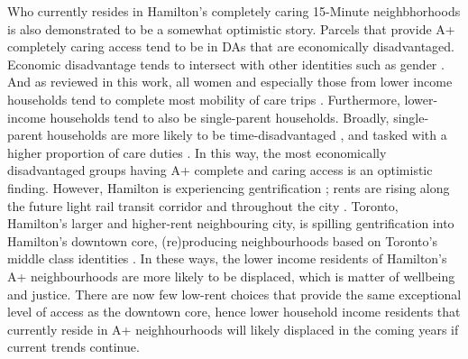 \documentclass[
  authoryear,
  preprint,
  3p]{elsarticle}
\begin{document}
Who currently resides in Hamilton's completely caring 15-Minute
neighbhorhoods is also demonstrated to be a somewhat optimistic story.
Parcels that provide A+ completely caring access tend to be in DAs that
are economically disadvantaged. Economic disadvantage tends to intersect
with other identities such as gender
\citep{lightmanMeasuringEconomicExclusion2018}. And as reviewed in this
work, all women and especially those from lower income households tend
to complete most mobility of care trips
\citep{ravensbergen2023exploratory}. Furthermore, lower-income
households tend to also be single-parent households. Broadly,
single-parent households are more likely to be time-disadvantaged
\citep{nieuwenhuisSingleparentFamiliesWork2018}, and tasked with a
higher proportion of care duties \citep{craigTimeCareComparison2004}. In
this way, the most economically disadvantaged groups having A+ complete
and caring access is an optimistic finding. However, Hamilton is
experiencing gentrification \citep{ellisyoungWeReJust2018}; rents are
rising along the future light rail transit corridor and throughout the
city
\citep{vandermerweSpilloverGentrificationMidsized2021, mayersLightTransitDocumenting2023}.
Toronto, Hamilton's larger and higher-rent neighbouring city, is
spilling gentrification into Hamilton's downtown core, (re)producing
neighbourhoods based on Toronto's middle class identities
\citep{mayersLightTransitDocumenting2023}. In these ways, the lower
income residents of Hamilton's A+ neighbourhoods are more likely to be
displaced, which is matter of wellbeing and justice. There are now few
low-rent choices that provide the same exceptional level of access as
the downtown core, hence lower household income residents that currently
reside in A+ neighhourhoods will likely displaced in the coming years if
current trends continue.
\end{document}

